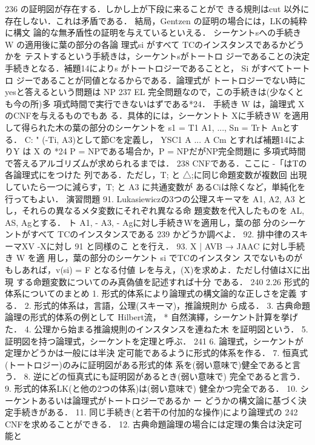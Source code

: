 \documentclass{ltjsarticle}
\theoremstyle{mystyle1}
\theoremstyle{mystyle3}
\theoremstyle{mystyle2}
\begin{document}
236
の証明図が存在する．しかし上が下段に来ることがで きる規則はcut 以外に存在しない．これは矛盾である． 結局，Gentzen の証明の場合には，LKの純粋に構文 論的な無矛盾性の証明を与えているといえる． シーケントsへの手続き W の適用後に葉の部分の各論 理式si がすべて TCのインスタンスであるかどうかを テストするという手続きは，シーケントsがトートロ ジーであることの決定手続きとなる．補題14によりs がトートロジーであることと， Si がすべてトートロ ジーであることが同値となるからである．論理式が トートロジーでない時に yesと答えるという問題は NP
237
EL
完全問題なので，この手続きは(少なくとも今の所)多 項式時間で実行できないはずである*24． 手続き W は，論理式 X のCNFを与えるものでもあ る．具体的には，シーケントト Xに手続きW を適用 して得られた木の葉の部分のシーケントを s1 = T1 A1, ..., Sn = Trト Anとする． C: " (-Ti, A3)として節Cを定義し， YSC1 A ... A Cm とすれば補題14によりY は X の
*24 P = NPである場合か，P = NPだがNP完全問題に
多項式時間で答えるアルゴリズムが求められるまでは．
238
CNFである．ここに -「はTの各論理式にをつけた 列である．ただし，T; と △;に同じ命題変数が複数回 出現していたら一つに減らす，T; と A3 に共通変数が あるCiは除くなど，単純化を行ってもよい．
演習問題 91. Lukasiewiczの3つの公理スキーマを A1, A2, A3
とし，それらの異なるメタ変数にそれぞれ異なる命 題変数を代入したものを AL, AS, Agとする． ト A1, - A3, - Agに対し手続きWを適用し，葉の部 分のシーケントがすべて TCのインスタンスである
239
かどうか調べよ． 92. 排中律のスキーマXV -Xに対し 91 と同様のこ
とを行え． 93. X | AVB → JAAC に対し手続き W を適 用し，葉の部分のシーケント si でTCのインスタン スでないものがもしあれば，v(si) = F となる付値 レを与え，(X)を求めよ．ただし付値はXに出現 する命題変数についてのみ真偽値を記述すれば十分 である．
240
2.26 形式的体系についてのまとめ 1. 形式的体系により論理式の構文論的な正しさを定義
する． 2. 形式的体系は，言語，公理(スキーマ)，推論規則か
ら成る． 3. 古典命題論理の形式的体系の例として Hilbert流， * 自然演繹，シーケント計算を挙げた．
4. 公理から始まる推論規則のインスタンスを連ねた木  を証明図という． 5. 証明図を持つ論理式，シーケントを定理と呼ぶ．
241
6. 論理式，シーケントが定理かどうかは一般には半決
定可能であるように形式的体系を作る． 7. 恒真式(トートロジー)のみに証明図がある形式的体
系を(弱い意味で)健全であると言う． 8. 逆にどの恒真式にも証明図があるとき(弱い意味で)
完全であると言う． 9. 形式的体系LK(と他の2つの体系)は(弱い意味で)
健全かつ完全である． 10. シーケントあるいは論理式がトートロジーであるか
ー どうかの構文論に基づく決定手続きがある． 11. 同じ手続き(と若干の付加的な操作)により論理式の
242
CNFを求めることができる． 12. 古典命題論理の場合には定理の集合は決定可能と
\end{document}
